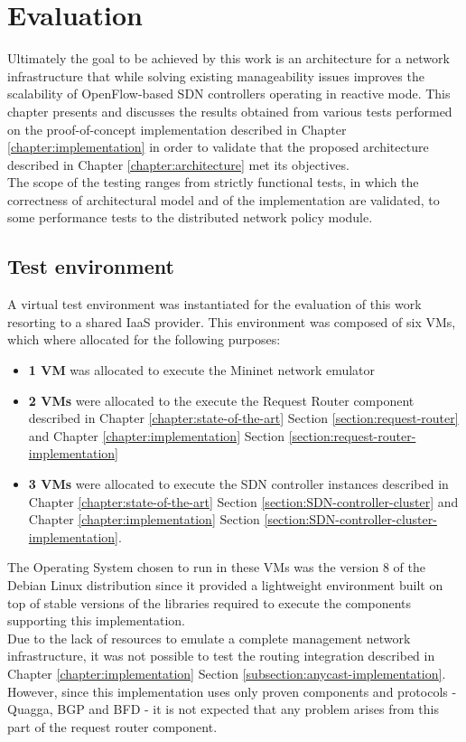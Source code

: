 
\chapter{Evaluation}
\label{chapter:evaluation}
Ultimately the goal to be achieved by this work is an architecture for a network infrastructure that while solving existing manageability issues improves the scalability of OpenFlow-based \gls{SDN} controllers operating in reactive mode.
This chapter presents and discusses the results obtained from various tests performed on the proof-of-concept implementation described in Chapter \ref{chapter:implementation} in order to validate that the proposed architecture described in Chapter \ref{chapter:architecture} met its objectives.\\
The scope of the testing ranges from strictly functional tests, in which the correctness of architectural model and of the implementation are validated, to some performance tests to the distributed network policy module.
%
\section{Test environment}
\label{section:test-environment}
A virtual test environment was instantiated for the evaluation of this work resorting to a shared \gls{IaaS} provider.
This environment was composed of six \glspl{VM}, which where allocated for the following purposes:
\begin{itemize}
	\item \textbf{1 \gls{VM}} was allocated to execute the Mininet network emulator
	\item \textbf{2 \glspl{VM}} were allocated to the execute the Request Router component described in Chapter \ref*{chapter:state-of-the-art} Section \ref{section:request-router} and Chapter \ref*{chapter:implementation} Section \ref{section:request-router-implementation}
	\item \textbf{3 \glspl{VM}} were allocated to execute the \gls{SDN} controller instances described in Chapter \ref*{chapter:state-of-the-art} Section \ref{section:SDN-controller-cluster} and Chapter \ref*{chapter:implementation} Section \ref{section:SDN-controller-cluster-implementation}.
\end{itemize}
%
The Operating System chosen to run in these \glspl{VM} was the version 8 of the Debian Linux distribution since it provided a lightweight environment built on top of stable versions of the libraries required to execute the components supporting this implementation.\\
Due to the lack of resources to emulate a complete management network infrastructure, it was not possible to test the routing integration described in Chapter \ref*{chapter:implementation} Section \ref{subsection:anycast-implementation}.
However, since this implementation uses only proven components and protocols - Quagga, \gls{BGP} and \gls{BFD} - it is not expected that any problem arises from this part of the request router component.
%
